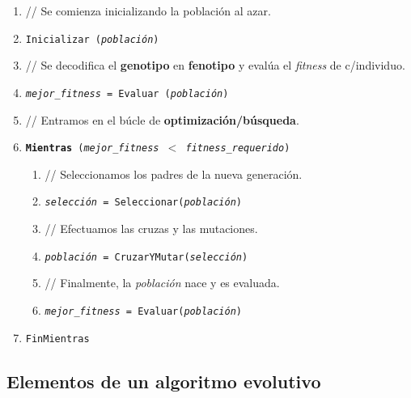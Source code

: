 \documentclass[10pt,a4paper]{article}
\begin{document}
\begin{enumerate}
\item[] {\color{darkgray} // Se comienza inicializando la población al azar.}
\item \texttt{Inicializar (\textit{población})}
\item[] {\color{darkgray} // Se decodifica el \textbf{genotipo} en \textbf{fenotipo} y evalúa el \textit{fitness} de c/individuo.}
\item \texttt{\textit{mejor\_fitness} = Evaluar (\textit{población})}
\item[] {\color{darkgray} // Entramos en el búcle de \textbf{optimización/búsqueda}.}
\item \texttt{\textbf{Mientras} (\textit{mejor\_fitness} $<$ \textit{fitness\_requerido})}
\begin{enumerate}[3.1]
\item[] {\color{darkgray} // Seleccionamos los padres de la nueva generación.}
\item \texttt{\textit{selección} = Seleccionar(\textit{población})}
\item[] {\color{darkgray} // Efectuamos las cruzas y las mutaciones.}
\item \texttt{\textit{población} = CruzarYMutar(\textit{selección})}
\item[] {\color{darkgray} // Finalmente, la \textit{población} nace y es evaluada.}
\item \texttt{\textit{mejor\_fitness} = Evaluar(\textit{población})}
\end{enumerate}
\item \texttt{FinMientras}
\end{enumerate}

\subsection{Elementos de un algoritmo evolutivo}
\end{document}
